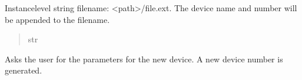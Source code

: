 \documentclass[letterpaper,10pt,english]{sphinxmanual}
\begin{document}
\begin{fulllineitems}
\begin{fulllineitems}
\begin{quote}
\begin{description}
\end{description}\end{quote}

\end{fulllineitems}


\begin{fulllineitems}
\label{\detokenize{Setup_PodInterface:Setup_PodInterface.Setup_Interface._saveFileName}}
\pysigstartsignatures
{}
\pysigstopsignatures
\sphinxAtStartPar
Instance\sphinxhyphen{}level string filename: \textless{}path\textgreater{}/file.ext. The device name and number             will be appended to the filename.
\begin{quote}\begin{description}
\sphinxAtStartPar
str

\end{description}\end{quote}

\end{fulllineitems}


\begin{fulllineitems}
\label{\detokenize{Setup_PodInterface:Setup_PodInterface.Setup_Interface.AddPODdevice}}
\pysigstartsignatures
{}
\pysigstopsignatures
\sphinxAtStartPar
Asks the user for the parameters for the new device. A new device number         is generated.

\end{fulllineitems}



\end{fulllineitems}
\end{document}
